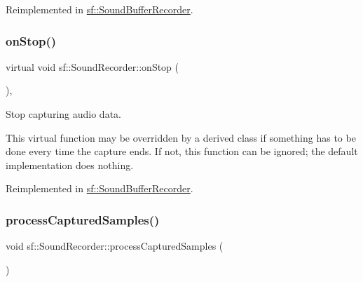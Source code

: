 Reimplemented in \mbox{\hyperlink{classsf_1_1_sound_buffer_recorder_a531a7445fc8a48eaf9fc039c83f17c6f}{sf\+::\+Sound\+Buffer\+Recorder}}.

\mbox{\label{classsf_1_1_sound_recorder_aefc36138ca1e96c658301280e4a31b64}} 
\subsubsection{\texorpdfstring{onStop()}{onStop()}}
{\footnotesize\ttfamily virtual void sf\+::\+Sound\+Recorder\+::on\+Stop (\begin{DoxyParamCaption}{ }\end{DoxyParamCaption})\hspace{0.3cm}{\ttfamily [protected]}, {\ttfamily [virtual]}}



Stop capturing audio data. 

This virtual function may be overridden by a derived class if something has to be done every time the capture ends. If not, this function can be ignored; the default implementation does nothing. \begin{DoxyVerb}\end{DoxyVerb}
 

Reimplemented in \mbox{\hyperlink{classsf_1_1_sound_buffer_recorder_ab8e53849312413431873a5869d509f1e}{sf\+::\+Sound\+Buffer\+Recorder}}.

\mbox{\label{classsf_1_1_sound_recorder_ab1b7b105c79081d044bc79cc74753ddf}} 
\subsubsection{\texorpdfstring{processCapturedSamples()}{processCapturedSamples()}}
{\footnotesize\ttfamily void sf\+::\+Sound\+Recorder\+::process\+Captured\+Samples (\begin{DoxyParamCaption}{ }\end{DoxyParamCaption})\hspace{0.3cm}{\ttfamily [private]}}



